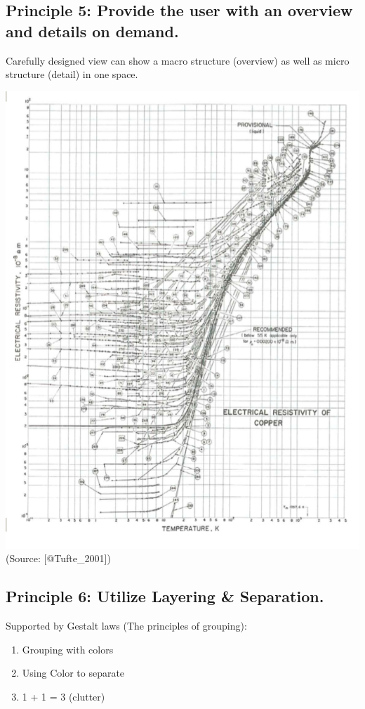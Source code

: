 \documentclass[]{book}
\providecommand{\tightlist}{%
  \setlength{\itemsep}{0pt}\setlength{\parskip}{0pt}}
\theoremstyle{definition}
\theoremstyle{definition}
\theoremstyle{definition}
\theoremstyle{remark}
\begin{document}
\subsection{Principle 5: Provide the user with an overview and details
on
demand.}\label{principle-5-provide-the-user-with-an-overview-and-details-on-demand.}

Carefully designed view can show a macro structure (overview) as well as
micro structure (detail) in one space.

\includegraphics{images/Tufte_figure9.png} (Source: {[}@Tufte\_2001{]})

\subsection{Principle 6: Utilize Layering \&
Separation.}\label{principle-6-utilize-layering-separation.}

Supported by Gestalt laws (The principles of grouping):

\begin{enumerate}
\def\labelenumi{\arabic{enumi}.}
\tightlist
\item
  Grouping with colors
\item
  Using Color to separate
\item
  1 + 1 = 3 (clutter)
\end{enumerate}
\end{document}
